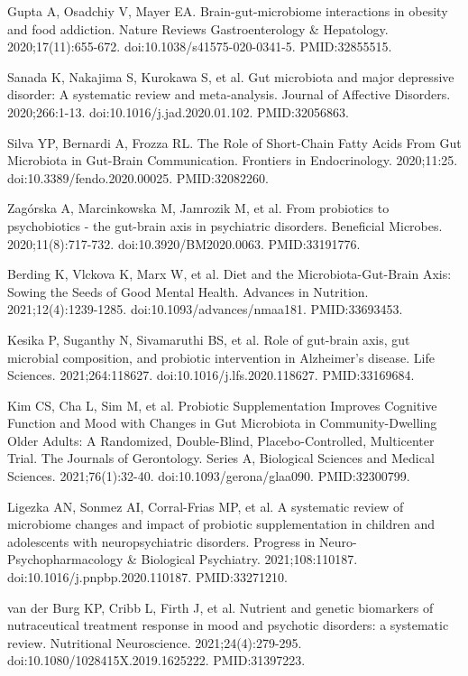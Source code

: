 \documentclass[12pt,oneside]{book}
\newcommand{\reff}[2]{\par\hangindent=7mm\hangafter=1\noindent[#1]\hspace{2mm}#2\par}
\begin{document}
\reff{6}{Gupta A, Osadchiy V, Mayer EA. Brain-gut-microbiome interactions in obesity and food addiction. Nature Reviews Gastroenterology \& Hepatology. 2020;17(11):655-672. doi:10.1038/s41575-020-0341-5. PMID:32855515.}

\reff{7}{Sanada K, Nakajima S, Kurokawa S, et al. Gut microbiota and major depressive disorder: A systematic review and meta-analysis. Journal of Affective Disorders. 2020;266:1-13. doi:10.1016/j.jad.2020.01.102. PMID:32056863.}

\reff{8}{Silva YP, Bernardi A, Frozza RL. The Role of Short-Chain Fatty Acids From Gut Microbiota in Gut-Brain Communication. Frontiers in Endocrinology. 2020;11:25. doi:10.3389/fendo.2020.00025. PMID:32082260.}

\reff{9}{Zagórska A, Marcinkowska M, Jamrozik M, et al. From probiotics to psychobiotics - the gut-brain axis in psychiatric disorders. Beneficial Microbes. 2020;11(8):717-732. doi:10.3920/BM2020.0063. PMID:33191776.}

\reff{10}{Berding K, Vlckova K, Marx W, et al. Diet and the Microbiota-Gut-Brain Axis: Sowing the Seeds of Good Mental Health. Advances in Nutrition. 2021;12(4):1239-1285. doi:10.1093/advances/nmaa181. PMID:33693453.}

\reff{11}{Kesika P, Suganthy N, Sivamaruthi BS, et al. Role of gut-brain axis, gut microbial composition, and probiotic intervention in Alzheimer's disease. Life Sciences. 2021;264:118627. doi:10.1016/j.lfs.2020.118627. PMID:33169684.}

\reff{12}{Kim CS, Cha L, Sim M, et al. Probiotic Supplementation Improves Cognitive Function and Mood with Changes in Gut Microbiota in Community-Dwelling Older Adults: A Randomized, Double-Blind, Placebo-Controlled, Multicenter Trial. The Journals of Gerontology. Series A, Biological Sciences and Medical Sciences. 2021;76(1):32-40. doi:10.1093/gerona/glaa090. PMID:32300799.}

\reff{13}{Ligezka AN, Sonmez AI, Corral-Frias MP, et al. A systematic review of microbiome changes and impact of probiotic supplementation in children and adolescents with neuropsychiatric disorders. Progress in Neuro-Psychopharmacology \& Biological Psychiatry. 2021;108:110187. doi:10.1016/j.pnpbp.2020.110187. PMID:33271210.}

\reff{14}{van der Burg KP, Cribb L, Firth J, et al. Nutrient and genetic biomarkers of nutraceutical treatment response in mood and psychotic disorders: a systematic review. Nutritional Neuroscience. 2021;24(4):279-295. doi:10.1080/1028415X.2019.1625222. PMID:31397223.}
\end{document}
